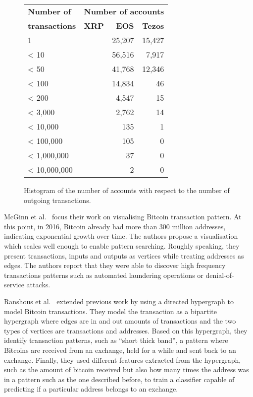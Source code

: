 \begin{figure}[tb]
    \footnotesize
    \centering
    \setlength{\tabcolsep}{16pt}
    \begin{tabular}{l r r r}
        \toprule
        \textbf{Number of} & \multicolumn{3}{l}{\textbf{Number of accounts}}\\
        \textbf{transactions} & \textbf{XRP} & \textbf{EOS} & \textbf{Tezos}\\
        \midrule
                   1 & &  25,207 & 15,427\\ 
                < 10 & &  56,516 &  7,917\\
               <  50 & &  41,768 & 12,346\\
              <  100 & &  14,834 &     46\\
              <  200 & &   4,547 &     15\\
             < 3,000 & &   2,762 &     14\\
            < 10,000 & &     135 &      1\\
           < 100,000 & &     105 &      0\\
         < 1,000,000 & &      37 &      0\\
        < 10,000,000 & &       2 &      0\\
    \bottomrule
    \end{tabular}
    \caption{Histogram of the number of accounts with respect to the number of outgoing transactions.}
    \label{tab:tx-count-histogram}
\end{figure}



McGinn et al.~\cite{mcginn2016visualizing} focus their work on visualising Bitcoin transaction pattern. At this point, in 2016, Bitcoin already had more than 300 million addresses, indicating exponential growth over time. The authors propose a visualisation which scales well enough to enable pattern searching. Roughly speaking, they present transactions, inputs and outputs as vertices while treating addresses as edges. The authors report that they were able to discover high frequency transactions patterns such as automated laundering operations or denial-of-service attacks.

Ranshous et al.~\cite{10.1007/978-3-319-70278-0_16} extended previous work by using a directed hypergraph to model Bitcoin transactions. They model the transaction as a bipartite hypergraph where edges are in and out amounts of transactions and the two types of vertices are transactions and addresses. Based on this hypergraph, they identify transaction patterns, such as ``short thick band'', a pattern where Bitcoins are received from an exchange, held for a while and sent back to an exchange. Finally, they used different features extracted from the hypergraph, such as the amount of bitcoin received but also how many times the address was in a pattern such as the one described before, to train a classifier capable of predicting if a particular address belongs to an exchange.

